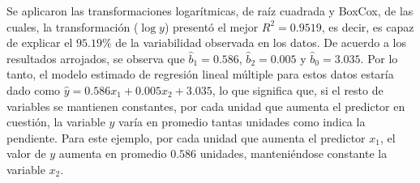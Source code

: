 \documentclass{article}
\begin{document}
Se aplicaron las transformaciones logarítmicas, de raíz cuadrada y Box\textendash Cox, de las cuales, la transformación ($\log y$) presentó el mejor $R^2 =0.9519$, es decir, es capaz de explicar el $95.19\%$ de la variabilidad observada en los datos. De acuerdo a los resultados arrojados, se observa que $\hat{b}_{1} = 0.586$, $\hat{b}_{2} = 0.005$ y $\hat{b}_{0} = 3.035$. Por lo tanto, el modelo estimado de regresión lineal múltiple para estos datos estaría dado como $\hat{y}=0.586x_{1} + 0.005x_{2} + 3.035$, lo que significa que, si el resto de variables se mantienen constantes, por cada unidad que aumenta el predictor en cuestión, la variable $y$ varía en promedio tantas unidades como indica la pendiente. Para este ejemplo, por cada unidad que aumenta el predictor $x_{1}$, el valor de $y$ aumenta en promedio $0.586$ unidades, manteniéndose constante la variable $x_{2}$.





\end{document}
